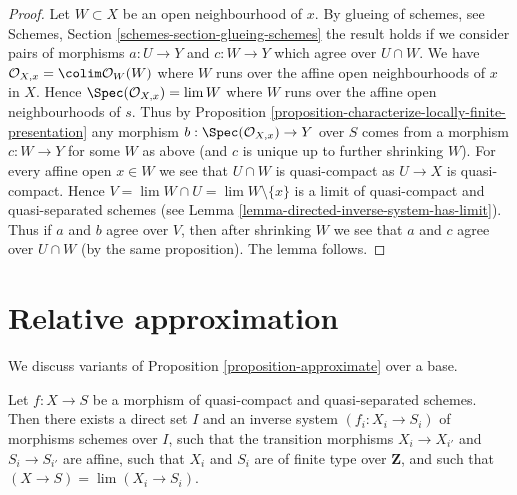 \begin{proof}
Let $W \subset X$ be an open neighbourhood of $x$. By
glueing of schemes, see
Schemes, Section \ref{schemes-section-glueing-schemes}
the result holds if we consider pairs of morphisms
$a : U \to Y$ and $c : W \to Y$ which agree over $U \cap W$.
We have $\mathcal{O}_{X, x} = \colim \mathcal{O}_W(W)$ where
$W$ runs over the affine open neighbourhoods of $x$ in $X$.
Hence $\Spec(\mathcal{O}_{X, x}) = \lim W$ where $W$
runs over the affine open neighbourhoods of $s$.
Thus by
Proposition \ref{proposition-characterize-locally-finite-presentation}
any morphism $b : \Spec(\mathcal{O}_{X, x}) \to Y$
over $S$ comes from a morphism $c : W \to Y$ for some $W$ as above
(and $c$ is unique up to further shrinking $W$).
For every affine open $x \in W$ we see that $U \cap W$
is quasi-compact as $U \to X$ is quasi-compact.
Hence $V = \lim W \cap U = \lim W \setminus \{x\}$ is a limit of
quasi-compact and quasi-separated schemes (see
Lemma \ref{lemma-directed-inverse-system-has-limit}).
Thus if $a$ and $b$ agree over $V$, then after shrinking $W$
we see that $a$ and $c$ agree over $U \cap W$ (by the same
proposition). The lemma follows.
\end{proof}







\section{Relative approximation}
\label{section-relative-approximation}

\noindent
We discuss variants of Proposition \ref{proposition-approximate}
over a base.

\begin{lemma}
\label{lemma-approximate-morphism}
Let $f : X \to S$ be a morphism of quasi-compact and quasi-separated schemes.
Then there exists a direct set $I$ and an inverse system $(f_i : X_i \to S_i)$
of morphisms schemes over $I$, such that the transition morphisms
$X_i \to X_{i'}$ and $S_i \to S_{i'}$ are affine, such that $X_i$
and $S_i$ are of finite type over $\mathbf{Z}$, and such that
$(X \to S) = \lim (X_i \to S_i)$.
\end{lemma}

